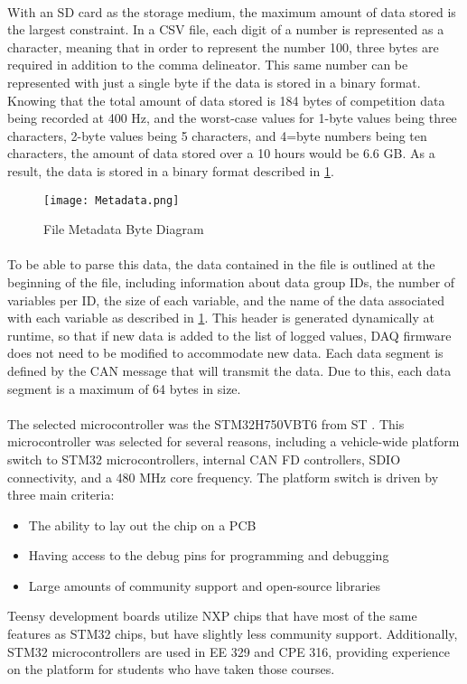 \paragraph{}
With an SD card as the storage medium, the maximum amount of data stored is the largest constraint.
In a CSV file, each digit of a number is represented as a character, meaning that in order to represent the number 100, three bytes are required in addition to the comma delineator.
This same number can be represented with just a single byte if the data is stored in a binary format.
Knowing that the total amount of data stored is 184 bytes of competition data being recorded at 400 Hz, and the worst-case values for 1-byte values being three characters, 2-byte values being 5 characters, and 4=byte numbers being ten characters, the amount of data stored over a 10 hours would be 6.6 GB.
As a result, the data is stored in a binary format described in \cref{fig:MetadataDiagram}.

\begin{figure}[H]
	\centering
	\texttt{[image: Metadata.png]}
	\caption{File Metadata Byte Diagram}
	\label{fig:MetadataDiagram}
\end{figure}

\paragraph{}
To be able to parse this data, the data contained in the file is outlined at the beginning of the file, including information about data group IDs, the number of variables per ID, the size of each variable, and the name of the data associated with each variable as described in \cref{fig:MetadataDiagram}.
This header is generated dynamically at runtime, so that if new data is added to the list of logged values, DAQ firmware does not need to be modified to accommodate new data.
Each data segment is defined by the CAN message that will transmit the data.
Due to this, each data segment is a maximum of 64 bytes in size.

\paragraph{}
The selected microcontroller was the STM32H750VBT6 from ST \cite{STMProductPage}.
This microcontroller was selected for several reasons, including a vehicle-wide platform switch to STM32 microcontrollers, internal CAN FD controllers, SDIO connectivity, and a 480 MHz core frequency.
The platform switch is driven by three main criteria:
\begin{itemize}
	\item The ability to lay out the chip on a PCB
	\item Having access to the debug pins for programming and debugging
	\item Large amounts of community support and open-source libraries
\end{itemize}
Teensy development boards utilize NXP chips that have most of the same features as STM32 chips, but have slightly less community support.
Additionally, STM32 microcontrollers are used in EE 329 and CPE 316, providing experience on the platform for students who have taken those courses.


